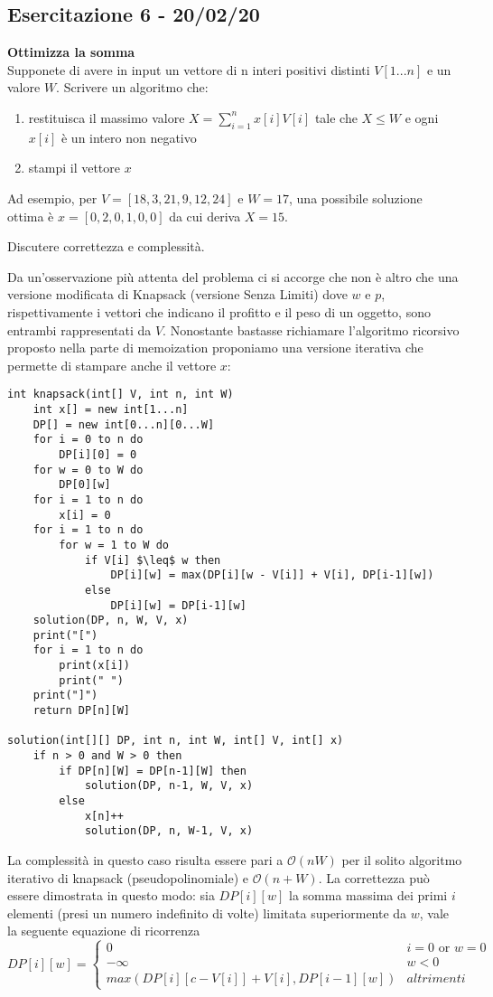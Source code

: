 \documentclass[../cheatSheetAlgoritmi.tex]{subfiles}
\begin{document}
\subsection{Esercitazione 6 - 20/02/20}
\textbf{Ottimizza la somma}\\
Supponete di avere in input un vettore di n interi positivi distinti $V[1. . . n]$ e un valore $W$. Scrivere un algoritmo che:
\begin{enumerate}
	\item restituisca il massimo valore $X =  \sum_{i = 1}^{n} x[i] V[i]$ tale che $X \leq W$ e ogni $x[i]$ è un intero non negativo
	\item stampi il vettore $x$
\end{enumerate}

Ad esempio, per $V = [18,3,21,9,12,24]$ e $W = 17$, una possibile soluzione ottima è 
\break 
$x = [0,2,0,1,0,0]$ da cui deriva $X= 15$.

Discutere correttezza e complessità.

\bigskip
Da un'osservazione più attenta del problema ci si accorge che non è altro che una versione modificata di Knapsack (versione Senza Limiti) dove $w$ e $p$, rispettivamente i vettori che indicano il profitto e il peso di un oggetto, sono entrambi rappresentati da $V$. Nonostante bastasse richiamare l'algoritmo ricorsivo proposto nella parte di memoization proponiamo una versione iterativa che permette di stampare anche il vettore $x$:


\begin{lstlisting}[caption=Ottimizza la Somma]
int knapsack(int[] V, int n, int W)
	int x[] = new int[1...n]
	DP[] = new int[0...n][0...W]
	for i = 0 to n do
		DP[i][0] = 0
	for w = 0 to W do
		DP[0][w]
	for i = 1 to n do
		x[i] = 0
	for i = 1 to n do
		for w = 1 to W do
			if V[i] $\leq$ w then
				DP[i][w] = max(DP[i][w - V[i]] + V[i], DP[i-1][w])
			else
				DP[i][w] = DP[i-1][w]
	solution(DP, n, W, V, x)
	print("[")
	for i = 1 to n do
		print(x[i])
		print(" ")
	print("]")
	return DP[n][W]
	
solution(int[][] DP, int n, int W, int[] V, int[] x)
	if n > 0 and W > 0 then
		if DP[n][W] = DP[n-1][W] then
			solution(DP, n-1, W, V, x)
		else
			x[n]++
			solution(DP, n, W-1, V, x)
\end{lstlisting}
La complessità in questo caso risulta essere pari a $\mathcal{O}(nW)$ per il solito algoritmo iterativo di knapsack (pseudopolinomiale) e $\mathcal{O}(n + W)$. La correttezza può essere dimostrata in questo modo: sia $DP[i][w]$ la somma massima dei primi $i$ elementi (presi un numero indefinito di volte) limitata superiormente da $w$, vale la seguente equazione di ricorrenza
\begin{equation*}
  	DP[i][w] =\begin{cases}
    	0 & \text{$i = 0$  or  $w = 0$}\\
    	-\infty & \text{$w < 0$}\\
    	max(DP[i][c-V[i]]+V[i], DP[i-1][w]) & \text{$altrimenti$}
  	\end{cases}
\end{equation*}

\bigskip
\end{document}
